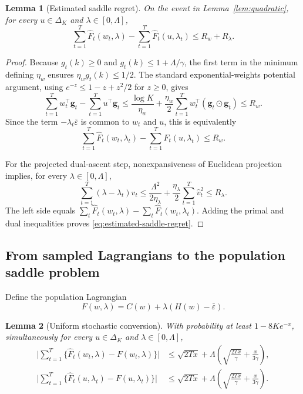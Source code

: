 \documentclass[11pt]{article}
\newtheorem{lemma}{Lemma}
\newcommand{\eps}{\varepsilon}
\newcommand{\simplex}{\Delta_K}
\begin{document}
\begin{lemma}[Estimated saddle regret]
\label{lem:estimated-saddle}
On the event in Lemma~\ref{lem:quadratic}, for every
$u\in\simplex$ and $\lambda\in[0,\Lambda]$,
\begin{equation}
  \sum_{t=1}^T\widehat F_t(w_t,\lambda)
  -\sum_{t=1}^T\widehat F_t(u,\lambda_t)
  \le R_w+R_\lambda.
  \label{eq:estimated-saddle-regret}
\end{equation}
\end{lemma}

\begin{proof}
Because $g_t(k)\ge0$ and
$g_t(k)\le1+\Lambda/\gamma$, the first term in the minimum defining
$\eta_w$ ensures $\eta_wg_t(k)\le1/2$.  The standard exponential-weights
potential argument, using $e^{-z}\le1-z+z^2/2$ for $z\ge0$, gives
\[
  \sum_{t=1}^T w_t^\top\boldsymbol g_t
  -\sum_{t=1}^T u^\top\boldsymbol g_t
  \le
  \frac{\log K}{\eta_w}
  +\frac{\eta_w}{2}
  \sum_{t=1}^T w_t^\top(\boldsymbol g_t\odot\boldsymbol g_t)
  \le R_w.
\]
Since the term $-\lambda_t\bar\eps$ is common to $w_t$ and $u$, this is
equivalently
\[
  \sum_{t=1}^T\widehat F_t(w_t,\lambda_t)
  -\sum_{t=1}^T\widehat F_t(u,\lambda_t)
  \le R_w.
\]

For the projected dual-ascent step, nonexpansiveness of Euclidean projection
implies, for every $\lambda\in[0,\Lambda]$,
\[
  \sum_{t=1}^T(\lambda-\lambda_t)\widehat v_t
  \le
  \frac{\Lambda^2}{2\eta_\lambda}
  +\frac{\eta_\lambda}{2}\sum_{t=1}^T\widehat v_t^2
  \le R_\lambda.
\]
The left side equals
$\sum_t\widehat F_t(w_t,\lambda)
-\sum_t\widehat F_t(w_t,\lambda_t)$.
Adding the primal and dual inequalities proves
\eqref{eq:estimated-saddle-regret}.
\end{proof}

\subsection{From sampled Lagrangians to the population saddle problem}

Define the population Lagrangian
\begin{equation}
  F(w,\lambda)
  =C(w)+\lambda(H(w)-\bar\eps).
  \label{eq:population-F}
\end{equation}

\begin{lemma}[Uniform stochastic conversion]
\label{lem:conversion}
With probability at least $1-8Ke^{-x}$, simultaneously for every
$u\in\simplex$ and $\lambda\in[0,\Lambda]$,
\begin{align}
  \Bigg|
  \sum_{t=1}^T\bigl\{
  \widehat F_t(w_t,\lambda)-F(w_t,\lambda)
  \bigr\}
  \Bigg|
  &\le
  \sqrt{2Tx}
  +\Lambda\left(
    \sqrt{\frac{2Tx}{\gamma}}+\frac{x}{3\gamma}
  \right),
  \label{eq:left-conversion}\\
  \Bigg|
  \sum_{t=1}^T\bigl\{
  \widehat F_t(u,\lambda_t)-F(u,\lambda_t)
  \bigr\}
  \Bigg|
  &\le
  \sqrt{2Tx}
  +\Lambda\left(
    \sqrt{\frac{2Tx}{\gamma}}+\frac{x}{3\gamma}
  \right).
  \label{eq:right-conversion}
\end{align}
\end{lemma}
\end{document}
